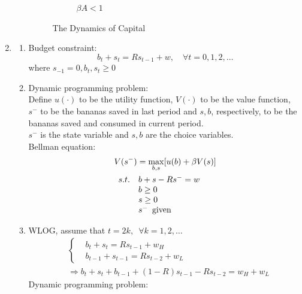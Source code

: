 \documentclass{article}
\begin{document}
\begin{enumerate}
\begin{enumerate}
\begin{figure}[h!]
\begin{subfigure}[b]{.8\linewidth}
                  \caption{$\beta A<1$}
                \end{subfigure}
                \caption{The Dynamics of Capital}
            \end{figure}
        \end{enumerate}
        \clearpage
        \item 
        \begin{enumerate}
            \item Budget constraint:
            \begin{equation*}
                b_t+s_t=Rs_{t-1}+w,\quad\forall t=0,1,2,\dots
            \end{equation*}
            where \(s_{-1}=0,b_t,s_t\ge0\)
            \item Dynamic programming problem:\\
            Define $u(\cdot)$ to be the utility function, $V(\cdot)$ to be the value function, $s^-$ to be the bananas saved in last period and $s,b$, respectively, to be the bananas saved and consumed in current period.\\
            $s^-$ is the state variable and $s,b$ are the choice variables.\\
            Bellman equation: 
            \begin{align*}
                &V(s^-)=\max_{b,s}[u(b)+\beta V(s)]\\
                &\begin{array}{r@{\quad}l}
                    s.t.&b+s-Rs^-=w\\
                    &b\ge0\\
                    &s\ge0\\
                    &s^-\enspace\text{given}   
                \end{array}           
            \end{align*}
            \item WLOG, assume that $t=2k,\enspace\forall k=1,2,\dots$
            \begin{align*}
                &\left\{\begin{aligned}
                    &b_t+s_t=Rs_{t-1}+w_H\\
                    &b_{t-1}+s_{t-1}=Rs_{t-2}+w_L
                \end{aligned}\right.\\
                &\Rightarrow b_t+s_t+b_{t-1}+(1-R)s_{t-1}-Rs_{t-2}=w_H+w_L
            \end{align*}
            Dynamic programming problem:\\

\end{enumerate}
\end{enumerate}
\end{document}

